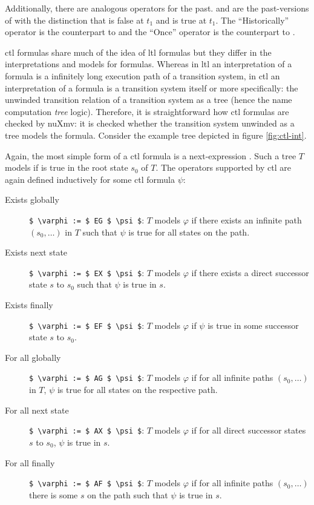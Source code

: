 Additionally, there are analogous operators for the past.
 and  are the past-versions of  with the distinction that  is false at $ t_1 $ and  is true at $ t_1 $.
The \enquote{Historically} operator  is the counterpart to  and the \enquote{Once} operator  is the counterpart to .

\gls{ctl} formulas share much of the idea of \gls{ltl} formulas but they differ in the interpretations and models for formulas.
Whereas in \gls{ltl} an interpretation of a formula is a infinitely long execution path of a transition system, in \gls{ctl} an interpretation of a formula is a transition system itself or more specifically: the unwinded transition relation of a transition system as a tree (hence the name computation \textit{tree} logic).
Therefore, it is straightforward how \gls{ctl} formulas are checked by nuXmv: it is checked whether the transition system unwinded as a tree models the formula.
Consider the example tree depicted in figure \ref{fig:ctl-int}.

Again, the most simple form of a \gls{ctl} formula is a next-expression .
Such a tree $ T $ models  if  is true in the root state $ s_0 $ of $ T $.
The operators supported by \gls{ctl} are again defined inductively for some \gls{ctl} formula $ \psi $:
\begin{description}
    \item[Exists globally] \lstinline[language=smv,mathescape=true]{$ \varphi := $ EG $ \psi $}: $ T $ models $ \varphi $ if there exists an infinite path $ (s_0, \dots) $ in $ T $ such that $ \psi $ is true for all states on the path.
    \item[Exists next state] \lstinline[language=smv,mathescape=true]{$ \varphi := $ EX $ \psi $}: $ T $ models $ \varphi $ if there exists a direct successor state $ s $ to $ s_0 $ such that $ \psi $ is true in $ s $.
    \item[Exists finally] \lstinline[language=smv,mathescape=true]{$ \varphi := $ EF $ \psi $}: $ T $ models $ \varphi $ if $ \psi $ is true in some successor state $ s $ to $ s_0 $.
    \item[For all globally] \lstinline[language=smv,mathescape=true]{$ \varphi := $ AG $ \psi $}: $ T $ models $ \varphi $ if for all infinite paths $ (s_0, \dots) $ in $ T $, $ \psi $ is true for all states on the respective path.
    \item[For all next state] \lstinline[language=smv,mathescape=true]{$ \varphi := $ AX $ \psi $}: $ T $ models $ \varphi $ if for all direct successor states $ s $ to $ s_0 $, $ \psi $ is true in $ s $.
    \item[For all finally] \lstinline[language=smv,mathescape=true]{$ \varphi := $ AF $ \psi $}: $ T $ models $ \varphi $ if for all infinite paths $ (s_0, \dots) $ there is some $ s $ on the path such that $ \psi $ is true in $ s $.
\end{description}

